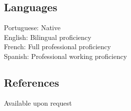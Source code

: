 \documentclass[a4paper]{deedy-resume} %
\begin{document}
\begin{minipage}[t]{0.35\textwidth}
\sectionspace %

\subsection{Languages}

Portuguese: Native \\
English: Bilingual proficiency \\
French: Full professional proficiency \\
Spanish: Professional working proficiency \\

\sectionspace %

\subsection{References} 
Available upon request

\sectionspace %


\end{minipage} %
\hfill
%
%
\end{document}
